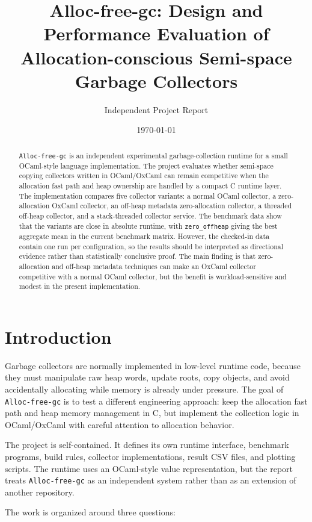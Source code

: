 \documentclass[11pt]{article}
\title{\textbf{Alloc-free-gc: Design and Performance Evaluation of Allocation-conscious Semi-space Garbage Collectors}}
\author{Independent Project Report}
\date{\today}
\begin{document}
\maketitle

\begin{abstract}
\texttt{Alloc-free-gc} is an independent experimental garbage-collection runtime
for a small OCaml-style language implementation. The project evaluates whether
semi-space copying collectors written in OCaml/OxCaml can remain competitive
when the allocation fast path and heap ownership are handled by a compact C
runtime layer. The implementation compares five collector variants: a normal
OCaml collector, a zero-allocation OxCaml collector, an off-heap metadata
zero-allocation collector, a threaded off-heap collector, and a stack-threaded
collector service. The benchmark data show that the variants are close in
absolute runtime, with \texttt{zero\_offheap} giving the best aggregate mean in
the current benchmark matrix. However, the checked-in data contain one run per
configuration, so the results should be interpreted as directional evidence
rather than statistically conclusive proof. The main finding is that
zero-allocation and off-heap metadata techniques can make an OxCaml collector
competitive with a normal OCaml collector, but the benefit is workload-sensitive
and modest in the present implementation.
\end{abstract}

\section{Introduction}

Garbage collectors are normally implemented in low-level runtime code, because
they must manipulate raw heap words, update roots, copy objects, and avoid
accidentally allocating while memory is already under pressure. The goal of
\texttt{Alloc-free-gc} is to test a different engineering approach: keep the
allocation fast path and heap memory management in C, but implement the
collection logic in OCaml/OxCaml with careful attention to allocation behavior.

The project is self-contained. It defines its own runtime interface, benchmark
programs, build rules, collector implementations, result CSV files, and plotting
scripts. The runtime uses an OCaml-style value representation, but the report
treats \texttt{Alloc-free-gc} as an independent system rather than as an
extension of another repository.

The work is organized around three questions:
\end{document}
